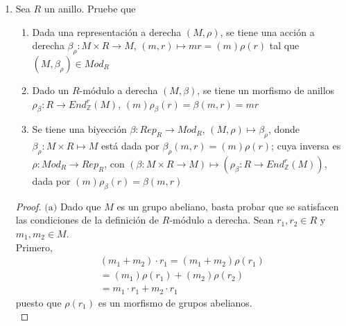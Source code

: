 \documentclass{article}
\newcommand{\lrprth}[1]{
    \left(#1\right)
}
\newcommand{\zend}[2]{
    End_{\mathbb{Z}}^{#2}\lrprth{#1}
}
\theoremstyle{definition}
\theoremstyle{plain}
\theoremstyle{plain}
\theoremstyle{definition}
\theoremstyle{definition}
\theoremstyle{definition}
\theoremstyle{definition}
\theoremstyle{definition}
\theoremstyle{definition}
\begin{document}
\begin{enumerate}[label=\textbf{Ej \arabic*.}]
\begin{proof}
\begin{align*}
         &=g\lrprth{\lrprth{{}_RM,\bullet_\lambda}}\\
         &=\lrprth{\lambda_{\bullet_\lambda},M}.
         \intertext{Sea $r\in R$ y $m\in M$. Se tiene que}
         \lambda_{\bullet_\lambda}(r)\lrprth{m}&=r\bullet_\lambda m\\
         &=\lambda(r)\lrprth{m}\\
         &\implies \lambda_{\bullet_\lambda}(r)=\lambda(r)\\
         &\implies \lambda_{\bullet_\lambda}=\lambda\\
         &\implies g\circ f\lrprth{\lrprth{\lambda,M}}=\lrprth{\lambda, M}\\
         \implies g\circ f &=Id_{{}_RRep}.
    \end{align*}
    De modo que $f$ es invertible, con inversa $g$, y por lo tanto es una biyección, con lo cual se tiene lo deseado.
    \end{proof}

    \item Sea $R$ un anillo. Pruebe que
	\begin{enumerate}
		\item Dada una representación a derecha $\lrprth{M, \rho}$, se tiene una acción a derecha $\beta_{\rho} : M \times R \longrightarrow M$, $\lrprth{m,r} \mapsto mr=\lrprth{m}\rho\lrprth{r}$ tal que $\lrprth{M, \beta_{\rho}}\in Mod_{R}$
		\item Dado un $R$-módulo a derecha $\lrprth{M, \beta}$, se tiene un morfismo de anillos $\rho_{\beta}:R \longrightarrow \zend{M}{r}$, $\lrprth{m}\rho_{\beta}\lrprth{r}=\beta\lrprth{m,r}=mr$
		\item Se tiene una biyección $\beta :Rep_{R} \longrightarrow Mod_{R}$, $\lrprth{M, \rho}\mapsto\beta_{\rho}$, donde $\beta_{\rho}:M \times R \mapsto M$ está dada por $\beta_{\rho}\lrprth{m,r}=\lrprth{m}\rho\lrprth{r}$; cuya inversa es $\rho :Mod_{R} \longrightarrow Rep_{R}$, con $\lrprth{\beta :M \times R \longrightarrow M}\mapsto\lrprth{\rho_{\beta}:R \longrightarrow\zend{M}{r}}$, dada por $\lrprth{m}\rho_{\beta}\lrprth{r}=\beta\lrprth{m,r}$
	\end{enumerate}
	\begin{proof}
		$\boxed{\text{(a)}}$ Dado que $M$ es un grupo abeliano, basta probar que se satisfacen las condiciones de la definición de $R$-módulo a derecha. Sean $r_{1},r_{2} \in R$ y $m_{1},m_{2} \in M$.\\

		Primero,
		\begin{align*}
			\lrprth{m_{1}+m_{2}} \cdot r_{1}=\lrprth{m_{1}+m_{2}}\rho\lrprth{r_{1}}\\
			=\lrprth{m_{1}} \rho \lrprth{r_{1}} + \lrprth{m_{2}} \rho \lrprth{r_{2}}\\
			=m_{1} \cdot r_{1} + m_{2} \cdot r_{1}
		\end{align*}
		puesto que $\rho \lrprth{r_{1}}$ es un morfismo de grupos abelianos.\\
	

\end{proof}
\end{enumerate}
\end{document}
